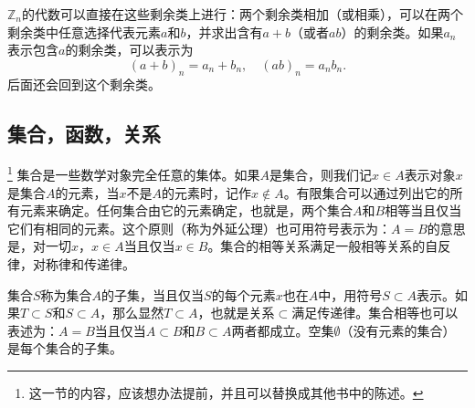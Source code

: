 $\mathbb{Z}_n$的代数可以直接在这些剩余类上进行：两个剩余类相加（或相乘），可以在两个剩余类中任意选择代表元素$a$和$b$，并求出含有$a+b$（或者$ab$）的剩余类。如果$a_n$表示包含$a$的剩余类，可以表示为
\[
(a+b)_n = a_n + b_n, \quad (ab)_n = a_nb_n.
\]
后面还会回到这个剩余类。

\subsection{集合，函数，关系}\footnote{这一节的内容，应该想办法提前，并且可以替换成其他书中的陈述。}
集合是一些数学对象完全任意的集体。如果$A$是集合，则我们记$x \in A$表示对象$x$是集合$A$的元素，当$x$不是$A$的元素时，记作$x \not\in A$。有限集合可以通过列出它的所有元素来确定。任何集合由它的元素确定，也就是，两个集合$A$和$B$相等当且仅当它们有相同的元素。这个原则（称为外延公理）也可用符号表示为：$A=B$的意思是，对一切$x$，$x \in A$当且仅当$x \in B$。集合的相等关系满足一般相等关系的自反律，对称律和传递律。

集合$S$称为集合$A$的子集，当且仅当$S$的每个元素$x$也在$A$中，用符号$S \subset A$表示。如果$T \subset S$和$S \subset A$，那么显然$T \subset A$，也就是关系$\subset$满足传递律。集合相等也可以表述为：$A=B$当且仅当$A \subset B$和$B \subset A$两者都成立。空集$\emptyset$（没有元素的集合）是每个集合的子集。






